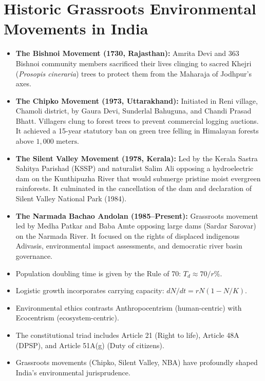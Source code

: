 \section{Historic Grassroots Environmental Movements in India}
\begin{itemize}[leftmargin=1.5em]
    \item \textbf{The Bishnoi Movement (1730, Rajasthan):} Amrita Devi and 363 Bishnoi community members sacrificed their lives clinging to sacred Khejri (\textit{Prosopis cineraria}) trees to protect them from the Maharaja of Jodhpur's axes.
    \item \textbf{The Chipko Movement (1973, Uttarakhand):} Initiated in Reni village, Chamoli district, by Gaura Devi, Sunderlal Bahuguna, and Chandi Prasad Bhatt. Villagers clung to forest trees to prevent commercial logging auctions. It achieved a 15-year statutory ban on green tree felling in Himalayan forests above $1{,}000\text{ meters}$.
    \item \textbf{The Silent Valley Movement (1978, Kerala):} Led by the Kerala Sastra Sahitya Parishad (KSSP) and naturalist Salim Ali opposing a hydroelectric dam on the Kunthipuzha River that would submerge pristine moist evergreen rainforests. It culminated in the cancellation of the dam and declaration of Silent Valley National Park (1984).
    \item \textbf{The Narmada Bachao Andolan (1985--Present):} Grassroots movement led by Medha Patkar and Baba Amte opposing large dams (Sardar Sarovar) on the Narmada River. It focused on the rights of displaced indigenous Adivasis, environmental impact assessments, and democratic river basin governance.
\end{itemize}

\begin{quickrevision}
\begin{itemize}[leftmargin=1.2em]
    \item Population doubling time is given by the Rule of 70: $T_d \approx 70 / r\%$.
    \item Logistic growth incorporates carrying capacity: $dN/dt = rN(1 - N/K)$.
    \item Environmental ethics contrasts Anthropocentrism (human-centric) with Ecocentrism (ecosystem-centric).
    \item The constitutional triad includes Article 21 (Right to life), Article 48A (DPSP), and Article 51A(g) (Duty of citizens).
    \item Grassroots movements (Chipko, Silent Valley, NBA) have profoundly shaped India's environmental jurisprudence.
\end{itemize}
\end{quickrevision}
